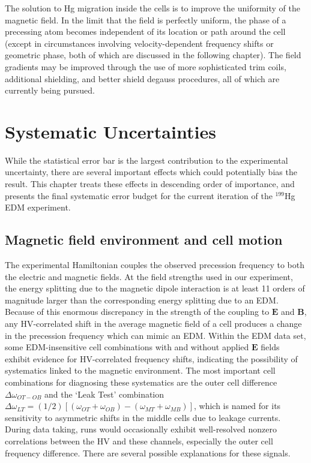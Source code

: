 \documentclass [10pt, twoside] {uwthesis}[2012/04/02]
\begin{document}
The solution to Hg migration inside the cells is to improve the uniformity of the magnetic field. In the limit that the field is perfectly uniform, the phase of a precessing atom becomes independent of its location or path around the cell (except in circumstances involving velocity-dependent frequency shifts or geometric phase, both of which are discussed in the following chapter). The field gradients may be improved through the use of more sophisticated trim coils, additional shielding, and better shield degauss procedures, all of which are currently being pursued.

\chapter{Systematic Uncertainties}
\label{SystematicChapter}
While the statistical error bar is the largest contribution to the experimental uncertainty, there are several important effects which could potentially bias the result. This chapter treats these effects in descending order of importance, and presents the final systematic error budget for the current iteration of the $^{199}$Hg EDM experiment.

\section{Magnetic field environment and cell motion}
The experimental Hamiltonian couples the observed precession frequency to both the electric and magnetic fields. At the field strengths used in our experiment, the energy splitting due to the magnetic dipole interaction is at least 11 orders of magnitude larger than the corresponding energy splitting due to an EDM. Because of this enormous discrepancy in the strength of the coupling to $\mathbf{E}$ and $\mathbf{B}$, any HV-correlated shift in the average magnetic field of a cell produces a change in the precession frequency which can mimic an EDM. Within the EDM data set, some EDM-insensitive cell combinations with and without applied $\mathbf{E}$ fields exhibit evidence for HV-correlated frequency shifts, indicating the possibility of systematics linked to the magnetic environment. The most important cell combinations for diagnosing these systematics are the outer cell difference $\Delta\omega_{OT-OB}$ and the `Leak Test' combination $\Delta\omega_{LT} = (1/2)[(\omega_{OT}+\omega_{OB}) - (\omega_{MT}+\omega_{MB})]$, which is named for its sensitivity to asymmetric shifts in the middle cells due to leakage currents. During data taking, runs would occasionally exhibit well-resolved nonzero correlations between the HV and these channels, especially the outer cell frequency difference. There are several possible explanations for these signals.
\end{document}
